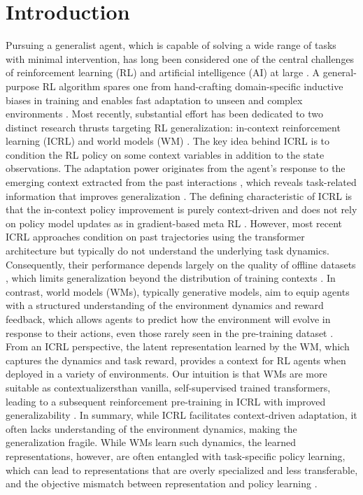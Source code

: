 \documentclass[letterpaper]{article}
\begin{document}
\section{Introduction}
Pursuing a generalist agent, which is capable of solving a wide range of tasks with minimal intervention, has long been considered one of the central challenges of reinforcement learning (RL) and artificial intelligence (AI) at large \cite{reed22gato}. A general-purpose RL algorithm spares one from hand-crafting domain-specific inductive biases in training \cite{silver19bias,li25piprl} and enables fast adaptation to unseen and complex environments \cite{tao22confluence}.
Most recently, substantial effort has been dedicated to two distinct research thrusts targeting RL generalization: in-context reinforcement learning (ICRL) \cite{laskin2023incontext} and world models (WM) \cite{silver20wm, hafner25worldmodel}. The key idea behind ICRL is to condition the RL policy on some context variables in addition to the state observations. The adaptation power originates from the agent's response to the emerging context extracted from the past interactions \cite{laskin2023incontext, tao23sce}, which reveals task-related information that improves generalization \cite{tao23cola}. The defining characteristic of ICRL is that the in-context policy improvement is purely context-driven and does not rely on policy model updates as in gradient-based meta RL \cite{finn17maml, fallah2021convergence, tao2024meta, pan-tao25meta-lqr}.
However, most recent ICRL approaches condition on past trajectories using the transformer architecture \cite{vaswani2017attention} but typically do not understand the underlying task dynamics. Consequently, their performance depends largely on the quality of offline datasets \cite{chen2021dt}, which limits generalization beyond the distribution of training contexts \cite{chen2024deep_survery}. In contrast, world models (WMs), typically generative models, aim to equip agents with a structured understanding of the environment dynamics and reward feedback, which allows agents to predict how the environment will evolve in response to their actions, even those rarely seen in the pre-training dataset  \cite{hafnerdream, hafner25worldmodel}.
From an ICRL perspective, the latent representation learned by the WM, which captures the dynamics and task reward, provides a context for RL agents when deployed in a variety of environments. Our intuition is that WMs are more suitable as contextualizersthan vanilla, self-supervised trained transformers, leading to a subsequent reinforcement pre-training in ICRL with improved generalizability \cite{moeini2025survey}. In summary, while ICRL facilitates context-driven adaptation, it often lacks understanding of the environment dynamics, making the generalization fragile. While WMs learn such dynamics, the learned representations, however, are often entangled with task-specific policy learning, which can lead to representations that are overly specialized and less transferable, and the objective mismatch between representation and policy learning \cite{eysenbach2022joint}.
\end{document}
